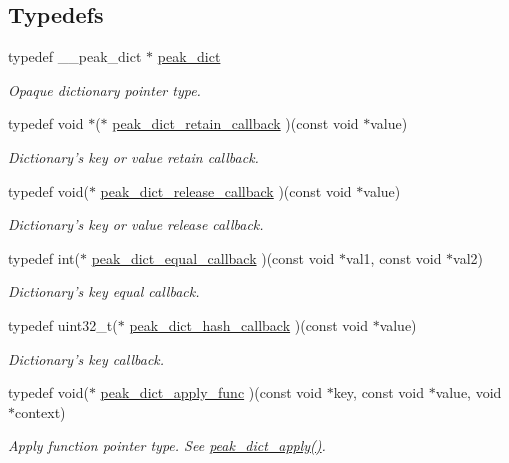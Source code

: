 \subsection*{Typedefs}
\begin{CompactItemize}
\item 
\hypertarget{group__dict_ga0}{
typedef \_\-\_\-peak\_\-dict $\ast$ \hyperlink{group__dict_ga0}{peak\_\-dict}}
\label{group__dict_ga0}

\begin{CompactList}\small\item\em Opaque dictionary pointer type. \item\end{CompactList}\item 
\hypertarget{group__dict_ga1}{
typedef void $\ast$($\ast$ \hyperlink{group__dict_ga1}{peak\_\-dict\_\-retain\_\-callback} )(const void $\ast$value)}
\label{group__dict_ga1}

\begin{CompactList}\small\item\em Dictionary's key or value retain callback. \item\end{CompactList}\item 
\hypertarget{group__dict_ga2}{
typedef void($\ast$ \hyperlink{group__dict_ga2}{peak\_\-dict\_\-release\_\-callback} )(const void $\ast$value)}
\label{group__dict_ga2}

\begin{CompactList}\small\item\em Dictionary's key or value release callback. \item\end{CompactList}\item 
typedef int($\ast$ \hyperlink{group__dict_ga3}{peak\_\-dict\_\-equal\_\-callback} )(const void $\ast$val1, const void $\ast$val2)
\begin{CompactList}\small\item\em Dictionary's key equal callback. \item\end{CompactList}\item 
typedef uint32\_\-t($\ast$ \hyperlink{group__dict_ga4}{peak\_\-dict\_\-hash\_\-callback} )(const void $\ast$value)
\begin{CompactList}\small\item\em Dictionary's key callback. \item\end{CompactList}\item 
\hypertarget{group__dict_ga21}{
typedef void($\ast$ \hyperlink{group__dict_ga21}{peak\_\-dict\_\-apply\_\-func} )(const void $\ast$key, const void $\ast$value, void $\ast$context)}
\label{group__dict_ga21}

\begin{CompactList}\small\item\em Apply function pointer type. See \hyperlink{group__dict_ga28}{peak\_\-dict\_\-apply()}. \item\end{CompactList}\end{CompactItemize}
